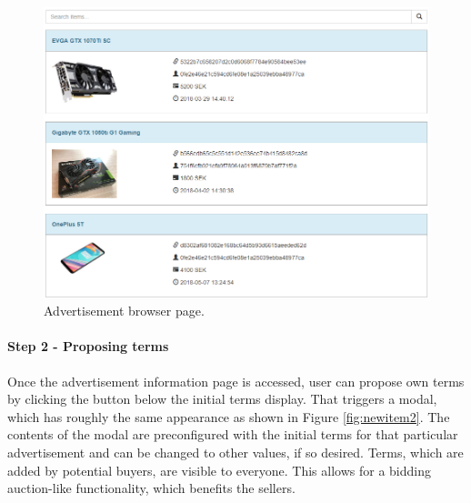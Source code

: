 \begin{figure}[H]
\centering
\includegraphics[scale=0.59]{app_screens/item_browser.png}
\caption{Advertisement browser page.}
\label{fig:itembrowser}
\end{figure}

\paragraph{Step 2 - Proposing terms}

Once the advertisement information page is accessed, user can propose own terms by clicking the button below the initial terms display. That triggers a modal, which has roughly the same appearance as shown in Figure \ref{fig:newitem2}. The contents of the modal are preconfigured with the initial terms for that particular advertisement and can be changed to other values, if so desired. Terms, which are added by potential buyers, are visible to everyone. This allows for a bidding auction-like functionality, which benefits the sellers.

